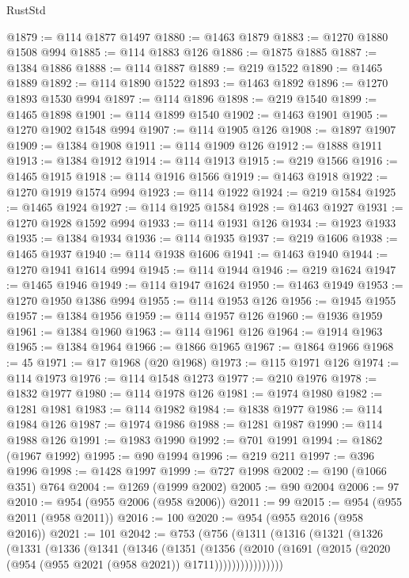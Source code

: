 \begin{lexlean}{RustStd}
\begin{coremodule}
@1879 := @114 @1877 @1497
@1880 := @1463 @1879
@1883 := @1270 @1880 @1508 @994
@1885 := @114 @1883 @126
@1886 := @1875 @1885
@1887 := @1384 @1886
@1888 := @114 @1887
@1889 := @219 @1522
@1890 := @1465 @1889
@1892 := @114 @1890 @1522
@1893 := @1463 @1892
@1896 := @1270 @1893 @1530 @994
@1897 := @114 @1896
@1898 := @219 @1540
@1899 := @1465 @1898
@1901 := @114 @1899 @1540
@1902 := @1463 @1901
@1905 := @1270 @1902 @1548 @994
@1907 := @114 @1905 @126
@1908 := @1897 @1907
@1909 := @1384 @1908
@1911 := @114 @1909 @126
@1912 := @1888 @1911
@1913 := @1384 @1912
@1914 := @114 @1913
@1915 := @219 @1566
@1916 := @1465 @1915
@1918 := @114 @1916 @1566
@1919 := @1463 @1918
@1922 := @1270 @1919 @1574 @994
@1923 := @114 @1922
@1924 := @219 @1584
@1925 := @1465 @1924
@1927 := @114 @1925 @1584
@1928 := @1463 @1927
@1931 := @1270 @1928 @1592 @994
@1933 := @114 @1931 @126
@1934 := @1923 @1933
@1935 := @1384 @1934
@1936 := @114 @1935
@1937 := @219 @1606
@1938 := @1465 @1937
@1940 := @114 @1938 @1606
@1941 := @1463 @1940
@1944 := @1270 @1941 @1614 @994
@1945 := @114 @1944
@1946 := @219 @1624
@1947 := @1465 @1946
@1949 := @114 @1947 @1624
@1950 := @1463 @1949
@1953 := @1270 @1950 @1386 @994
@1955 := @114 @1953 @126
@1956 := @1945 @1955
@1957 := @1384 @1956
@1959 := @114 @1957 @126
@1960 := @1936 @1959
@1961 := @1384 @1960
@1963 := @114 @1961 @126
@1964 := @1914 @1963
@1965 := @1384 @1964
@1966 := @1866 @1965
@1967 := @1864 @1966
@1968 := 45
@1971 := @17 @1968 (@20 @1968)
@1973 := @115 @1971 @126
@1974 := @114 @1973
@1976 := @114 @1548 @1273
@1977 := @210 @1976
@1978 := @1832 @1977
@1980 := @114 @1978 @126
@1981 := @1974 @1980
@1982 := @1281 @1981
@1983 := @114 @1982
@1984 := @1838 @1977
@1986 := @114 @1984 @126
@1987 := @1974 @1986
@1988 := @1281 @1987
@1990 := @114 @1988 @126
@1991 := @1983 @1990
@1992 := @701 @1991
@1994 := @1862 (@1967 @1992)
@1995 := @90 @1994
@1996 := @219 @211
@1997 := @396 @1996
@1998 := @1428 @1997
@1999 := @727 @1998
@2002 := @190 (@1066 @351) @764
@2004 := @1269 (@1999 @2002)
@2005 := @90 @2004
@2006 := 97
@2010 := @954 (@955 @2006 (@958 @2006))
@2011 := 99
@2015 := @954 (@955 @2011 (@958 @2011))
@2016 := 100
@2020 := @954 (@955 @2016 (@958 @2016))
@2021 := 101
@2042 := @753
    (@756
      (@1311
        (@1316
          (@1321
            (@1326
              (@1331
                (@1336
                  (@1341
                    (@1346
                      (@1351
                        (@1356
                          (@2010
                            (@1691
                              (@2015 (@2020 (@954 (@955 @2021 (@958 @2021)) @1711))))))))))))))))

\end{coremodule}
\end{lexlean}
